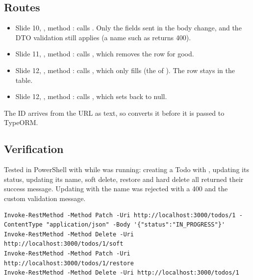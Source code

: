 \subsection{Routes}
\begin{itemize}
\item Slide 10, , method : calls . Only the fields sent in the body change, and the DTO validation still applies (a name such as  returns 400).
\item Slide 11, , method : calls , which removes the row for good.
\item Slide 12, , method : calls , which only fills  (the  of ). The row stays in the table.
\item Slide 12, , method : calls , which sets  back to null.
\end{itemize}
The ID arrives from the URL as text, so  converts it before it is passed to TypeORM.


\subsection{Verification}
Tested in PowerShell with  while  was running: creating a Todo with , updating its status, updating its name, soft delete, restore and hard delete all returned their success message. Updating with the name  was rejected with a 400 and the custom validation message.
\begin{lstlisting}[language={}]
Invoke-RestMethod -Method Patch -Uri http://localhost:3000/todos/1 -ContentType "application/json" -Body '{"status":"IN_PROGRESS"}'
Invoke-RestMethod -Method Delete -Uri http://localhost:3000/todos/1/soft
Invoke-RestMethod -Method Patch -Uri http://localhost:3000/todos/1/restore
Invoke-RestMethod -Method Delete -Uri http://localhost:3000/todos/1
\end{lstlisting}


